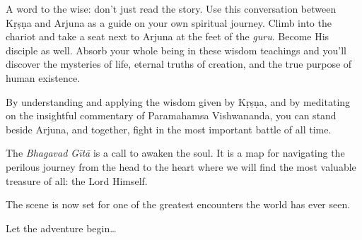 A word to the wise: don’t just read the story. Use this conversation between Kṛṣṇa and Arjuna as a guide on your own spiritual journey. Climb into the chariot and take a seat next to Arjuna at the feet of the \textit{guru}. Become His disciple as well. Absorb your whole being in these wisdom teachings and you’ll discover the mysteries of life, eternal truths of creation, and the true purpose of human existence.

By understanding and applying the wisdom given by Kṛṣṇa, and by meditating on the insightful commentary of Paramahamsa Vishwananda, you can stand beside Arjuna, and together, fight in the most important battle of all time.

The \textit{Bhagavad Gītā} is a call to awaken the soul. It is a map for navigating the perilous journey from the head to the heart where we will find the most valuable treasure of all: the Lord Himself.

The scene is now set for one of the greatest encounters the world has ever seen.

Let the adventure begin\ldots
